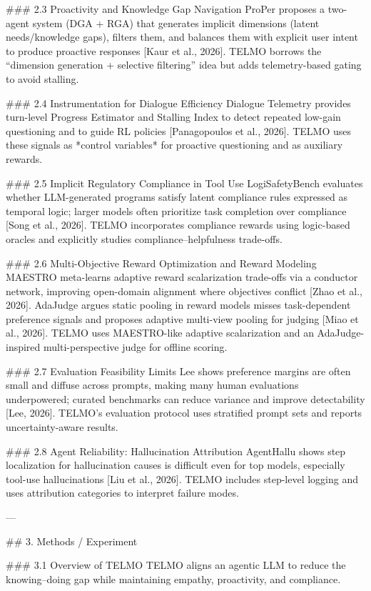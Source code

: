 ### 2.3 Proactivity and Knowledge Gap Navigation  
ProPer proposes a two-agent system (DGA + RGA) that generates implicit dimensions (latent needs/knowledge gaps), filters them, and balances them with explicit user intent to produce proactive responses [Kaur et al., 2026]. TELMO borrows the “dimension generation + selective filtering” idea but adds telemetry-based gating to avoid stalling.

### 2.4 Instrumentation for Dialogue Efficiency  
Dialogue Telemetry provides turn-level Progress Estimator and Stalling Index to detect repeated low-gain questioning and to guide RL policies [Panagopoulos et al., 2026]. TELMO uses these signals as *control variables* for proactive questioning and as auxiliary rewards.

### 2.5 Implicit Regulatory Compliance in Tool Use  
LogiSafetyBench evaluates whether LLM-generated programs satisfy latent compliance rules expressed as temporal logic; larger models often prioritize task completion over compliance [Song et al., 2026]. TELMO incorporates compliance rewards using logic-based oracles and explicitly studies compliance–helpfulness trade-offs.

### 2.6 Multi-Objective Reward Optimization and Reward Modeling  
MAESTRO meta-learns adaptive reward scalarization trade-offs via a conductor network, improving open-domain alignment where objectives conflict [Zhao et al., 2026]. AdaJudge argues static pooling in reward models misses task-dependent preference signals and proposes adaptive multi-view pooling for judging [Miao et al., 2026]. TELMO uses MAESTRO-like adaptive scalarization and an AdaJudge-inspired multi-perspective judge for offline scoring.

### 2.7 Evaluation Feasibility Limits  
Lee shows preference margins are often small and diffuse across prompts, making many human evaluations underpowered; curated benchmarks can reduce variance and improve detectability [Lee, 2026]. TELMO’s evaluation protocol uses stratified prompt sets and reports uncertainty-aware results.

### 2.8 Agent Reliability: Hallucination Attribution  
AgentHallu shows step localization for hallucination causes is difficult even for top models, especially tool-use hallucinations [Liu et al., 2026]. TELMO includes step-level logging and uses attribution categories to interpret failure modes.

---

## 3. Methods / Experiment  

### 3.1 Overview of TELMO  
TELMO aligns an agentic LLM to reduce the knowing–doing gap while maintaining empathy, proactivity, and compliance.

